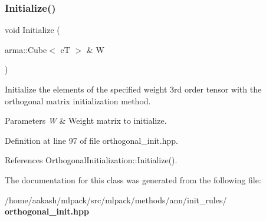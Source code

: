 \mbox{\label{classmlpack_1_1ann_1_1OrthogonalInitialization_ae2f3e6d570824a160b687ff9f734f83c}} 
\subsubsection{Initialize()\hspace{0.1cm}{\footnotesize\ttfamily [4/4]}}
{\footnotesize\ttfamily void Initialize (\begin{DoxyParamCaption}\item[{arma\+::\+Cube$<$ eT $>$ \&}]{W }\end{DoxyParamCaption})\hspace{0.3cm}{\ttfamily [inline]}}



Initialize the elements of the specified weight 3rd order tensor with the orthogonal matrix initialization method. 


\begin{DoxyParams}{Parameters}
{\em W} & Weight matrix to initialize. \\
\hline
\end{DoxyParams}


Definition at line 97 of file orthogonal\+\_\+init.\+hpp.



References Orthogonal\+Initialization\+::\+Initialize().



The documentation for this class was generated from the following file\+:\begin{DoxyCompactItemize}
\item 
/home/aakash/mlpack/src/mlpack/methods/ann/init\+\_\+rules/\textbf{ orthogonal\+\_\+init.\+hpp}\end{DoxyCompactItemize}
